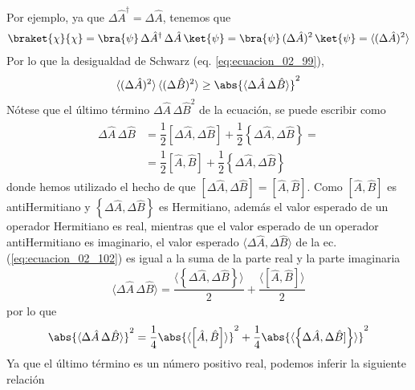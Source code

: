 Por ejemplo, ya que $\Delta \hat{A}^{\dagger} = \Delta \hat{A}$, tenemos que
\begin{align*}
\braket{\chi}{\chi} = \bra{\psi} \, \Delta \hat{A}^{\dagger} \, \Delta \hat{A} \, \ket{\psi} = \bra{\psi} \, (\Delta \hat{A})^{2} \, \ket{\psi} = \langle (\Delta \hat{A})^{2} \rangle
\end{align*}
Por lo que la desigualdad de Schwarz (eq. \ref{eq:ecuacion_02_99}),
\begin{equation}
\langle (\Delta \hat{A})^{2} \rangle \, \langle (\Delta \hat{B})^{2} \rangle \geq \abs{\langle \Delta \hat{A} \, \Delta \hat{B}\rangle}^{2} 
\label{eq:ecuacion_02_101}
\end{equation}
Nótese que el último término $\Delta \hat{A} \, \Delta \hat{B}^{2}$ de la ecuación, se puede escribir como
\begin{align}
\begin{aligned}
\Delta \hat{A} \, \Delta \hat{B} &= \dfrac{1}{2} \left[ \Delta \hat{A} , \Delta \hat{B} \right] + \dfrac{1}{2} \left\{ \Delta \hat{A} , \Delta \hat{B} \right\} = \\[0.5em]
&= \dfrac{1}{2}  \left[ \hat{A} , \hat{B} \right] + \dfrac{1}{2} \left\{ \Delta \hat{A} , \Delta \hat{B} \right\}
\end{aligned}
\label{eq:ecuacion_02_102}
\end{align}
donde hemos utilizado el hecho de que $[\Delta \hat{A},\Delta \hat{B}]= [\hat{A}, \hat{B}]$. Como $[\hat{A}, \hat{B}]$ es antiHermitiano y $\left\{ \Delta \hat{A},\Delta \hat{B} \right\}$ es Hermitiano, además el valor esperado de un operador Hermitiano es real, mientras que el valor esperado de un operador antiHermitiano es imaginario, el valor esperado $\langle \Delta \hat{A}, \Delta \hat{B} \rangle$ de la ec. (\ref{eq:ecuacion_02_102}) es igual a la suma de la parte real y la parte imaginaria
\begin{align*}
\langle \Delta \hat{A} \, \Delta \hat{B} \rangle = \dfrac{\langle \left\{ \Delta \hat{A},\Delta \hat{B} \right\} \rangle}{2} + \dfrac{\langle [\hat{A}, \hat{B}] \rangle}{2}
\end{align*}
por lo que
\begin{equation}
\abs{ \langle \Delta \hat{A} \, \Delta \hat{B} \rangle}^{2} = \dfrac{1}{4} \abs{\langle \left[ \hat{A}, \hat{B} \right] \rangle}^{2} + \dfrac{1}{4} \abs{ \langle \left\{ \Delta \hat{A}, \Delta \hat{B}] \right\} \rangle}^{2}
\label{eq:ecuacion_02_103}
\end{equation}
Ya que el último término es un número positivo real, podemos inferir la siguiente relación
